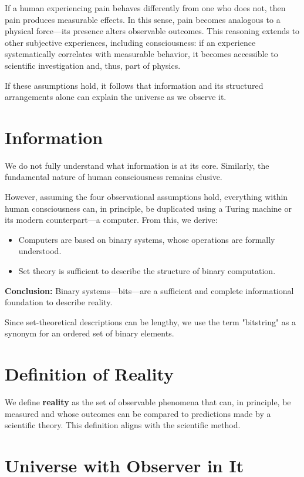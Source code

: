 \documentclass[11pt]{article}
\begin{document}
If a human experiencing pain behaves differently from one who does not, then pain produces measurable effects. In this sense, pain becomes analogous to a physical force—its presence alters observable outcomes. This reasoning extends to other subjective experiences, including consciousness: if an experience systematically correlates with measurable behavior, it becomes accessible to scientific investigation and, thus, part of physics.

If these assumptions hold, it follows that information and its structured arrangements alone can explain the universe as we observe it.

\section{Information}

We do not fully understand what information is at its core. Similarly, the fundamental nature of human consciousness remains elusive.

However, assuming the four observational assumptions hold, everything within human consciousness can, in principle, be duplicated using a Turing machine or its modern counterpart—a computer. From this, we derive:

\begin{itemize}
      \item Computers are based on binary systems, whose operations are formally understood.
      \item Set theory is sufficient to describe the structure of binary computation.
\end{itemize}

\textbf{Conclusion:} Binary systems—bits—are a sufficient and complete informational foundation to describe reality.

Since set-theoretical descriptions can be lengthy, we use the term "bitstring" as a synonym for an ordered set of binary elements.

\section{Definition of Reality}

We define \textbf{reality} as the set of observable phenomena that can, in principle, be measured and whose outcomes can be compared to predictions made by a scientific theory. This definition aligns with the scientific method.

\section{Universe with Observer in It}
\end{document}
